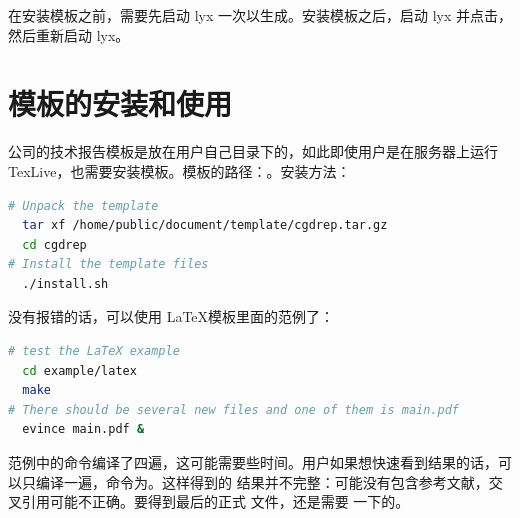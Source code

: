 在安装模板之前，需要先启动 lyx 一次以生成。安装模板之后，启动 lyx 并点击，然后重新启动 lyx。

\section{模板的安装和使用}
公司的技术报告模板是放在用户自己目录下的，如此即使用户是在服务器上运行 TexLive，也需要安装模板。模板的路径：。安装方法：
\begin{lstlisting}[language=sh,caption={安装模板}]
# Unpack the template
  tar xf /home/public/document/template/cgdrep.tar.gz
  cd cgdrep
# Install the template files
  ./install.sh
\end{lstlisting}

没有报错的话，可以使用 \LaTeX 模板里面的范例了：
\begin{lstlisting}[language=sh,caption={模板示例}]
# test the LaTeX example
  cd example/latex
  make
# There should be several new files and one of them is main.pdf
  evince main.pdf &
\end{lstlisting}

范例中的命令编译了四遍，这可能需要些时间。用户如果想快速看到结果的话，可以只编译一遍，命令为。这样得到的 结果并不完整：可能没有包含参考文献，交叉引用可能不正确。要得到最后的正式 文件，还是需要 一下的。
